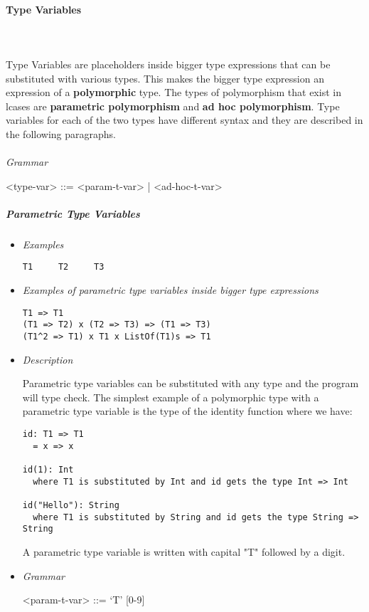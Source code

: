 \documentclass{article}
\begin{document}
\paragraph{Type Variables}
\mbox{}\\\\
Type Variables are placeholders inside bigger type expressions that can be
substituted with various types. This makes the bigger type expression an
expression of a \textbf{polymorphic} type. The types of polymorphism that exist
in lcases are \textbf{parametric polymorphism} and \textbf{ad hoc
polymorphism}. Type variables for each of the two types have different syntax
and they are described in the following paragraphs.
\\\\
\textit{Grammar}
\begin{grammar}
<type-var> ::= <param-t-var> | <ad-hoc-t-var> \\ 
\end{grammar}
\subparagraph{Parametric Type Variables}

\begin{itemize}
\item \textit{Examples}
\begin{verbatim}
T1     T2     T3 
\end{verbatim}

\item
\textit{Examples of parametric type variables inside bigger type expressions}
\begin{verbatim}
T1 => T1
(T1 => T2) x (T2 => T3) => (T1 => T3)
(T1^2 => T1) x T1 x ListOf(T1)s => T1
\end{verbatim}

\item \textit{Description}

Parametric type variables can be substituted with any type and the program will
type check.  The simplest example of a polymorphic type with a parametric type
variable is the type of the identity function where we have:
\begin{verbatim}
id: T1 => T1
  = x => x

id(1): Int
  where T1 is substituted by Int and id gets the type Int => Int

id("Hello"): String
  where T1 is substituted by String and id gets the type String => String
\end{verbatim}

A parametric type variable is written with capital "T" followed by a digit.

\item \textit{Grammar}
\begin{grammar}
<param-t-var> ::= `T' [0-9] \\ 
\end{grammar}
\end{itemize}
\end{document}
